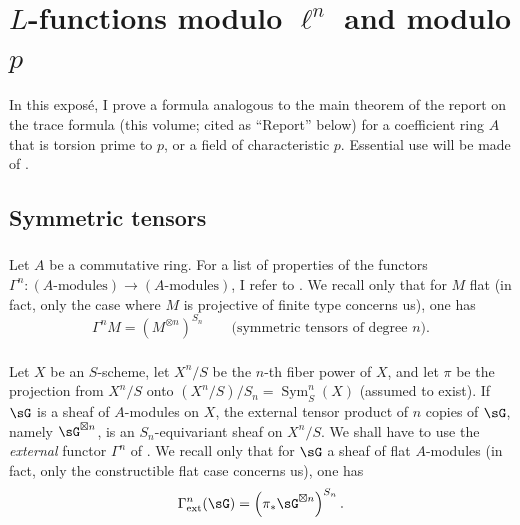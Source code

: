 
\chapter{\texorpdfstring{$L$}{L}-functions modulo \texorpdfstring{$\ell^n$}{l n} and modulo \texorpdfstring{$p$}{p}}\label{III}

In this exposé, I prove a formula analogous to the main theorem of the report on
the trace formula (this volume; cited as ``Report'' below) for a coefficient
ring $A$ that is torsion prime to $p$, or a field of characteristic $p$.
Essential use will be made of \cite[XVII 5.5]{sga4}.










\section{Symmetric tensors}\label{III:1}





\subsection{}\label{III:1-1}

Let $A$ be a commutative ring. For a list of properties of the functors
$\Gamma^n:(\text{$A$-modules})\to (\text{$A$-modules})$, I refer to
\cite[XVII 5.5.1 and 2]{sga4}. We recall only that for $M$ flat (in fact, only
the case where $M$ is projective of finite type concerns us), one has
\[
  \Gamma^n M = \left(M^{\otimes n}\right)^{S_n} \qquad \text{(symmetric tensors of degree $n$).}
\]






\subsection{}\label{III:1-2}

Let $X$ be an $S$-scheme, let $X^n/S$ be the $n$-th fiber power of $X$, and
let $\pi$ be the projection from $X^n/S$ onto
$(X^n/S)/S_n=\operatorname{Sym}_S^n(X)$ (assumed to exist). If $\sG$ is a
sheaf of $A$-modules on $X$, the external tensor product of $n$ copies of
$\sG$, namely $\sG^{\boxtimes n}$, is an $S_n$-equivariant sheaf on $X^n/S$.
We shall have to use the \emph{external} functor $\Gamma^n$ of
\cite[XVII 5.5.7 to 9]{sga4}. We recall only that for $\sG$ a sheaf of flat
$A$-modules (in fact, only the constructible flat case concerns us), one has
\[
  \Gamma_\text{ext}^n(\sG) = \left(\pi_*\sG^{\boxtimes n}\right)^{S_n} \text{.}
\]






